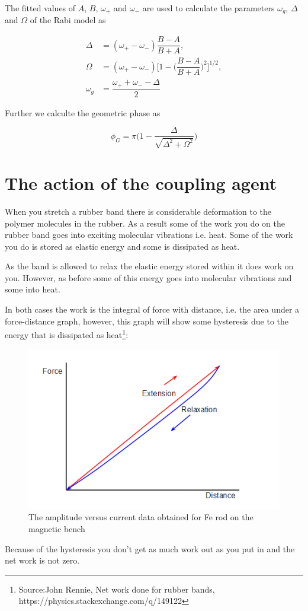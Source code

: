 The fitted values of $ A $, $ B $, $ \omega_{+} $ and $ \omega_{-} $ are used to calculate the parameters $ \omega_g $, $ \Delta $ and $ \Omega $ of the Rabi model as

\begin{equation}
	\begin{split}
		\Delta &= (\omega_{+} - \omega_{-}) \dfrac{B-A}{B+A}, \\
		\Omega &= (\omega_{+} - \omega_{-}) \Bigg[ 1 - \Bigg(  \dfrac{B-A}{B+A} \Bigg)^2  \Bigg]^{1/2}, \\
		\omega_g &= \dfrac{\omega_{+} + \omega_{-} - \Delta}{2}
	\end{split}
\end{equation}

Further we calculte the geometric phase as

\begin{equation}
	\phi_G = \pi \Bigg( 1 - \dfrac{\Delta}{\sqrt{\Delta^2 + \Omega^2 }} \Bigg)
\end{equation}

\section{The action of the coupling agent}
When you stretch a rubber band there is considerable deformation to the polymer molecules in the rubber. As a result some of the work you do on the rubber band goes into exciting molecular vibrations i.e. heat. Some of the work you do is stored as elastic energy and some is dissipated as heat.

As the band is allowed to relax the elastic energy stored within it does work on you. However, as before some of this energy goes into molecular vibrations and some into heat.

In both cases the work is the integral of force with distance, i.e. the area under a force-distance graph, however, this graph will show some hysteresis due to the energy that is dissipated as heat\footnote{Source:John Rennie, Net work done for rubber bands, https://physics.stackexchange.com/q/149122}:
\begin{figure}[H]
	\centering
	\includegraphics[scale=0.5]{Rubberband hysteresis.png}
	\caption{The amplitude versus current data obtained for Fe rod on the magnetic bench}
	\label{fig:mb-fe-0}
\end{figure}
Because of the hysteresis you don't get as much work out as you put in and the net work is not zero.

